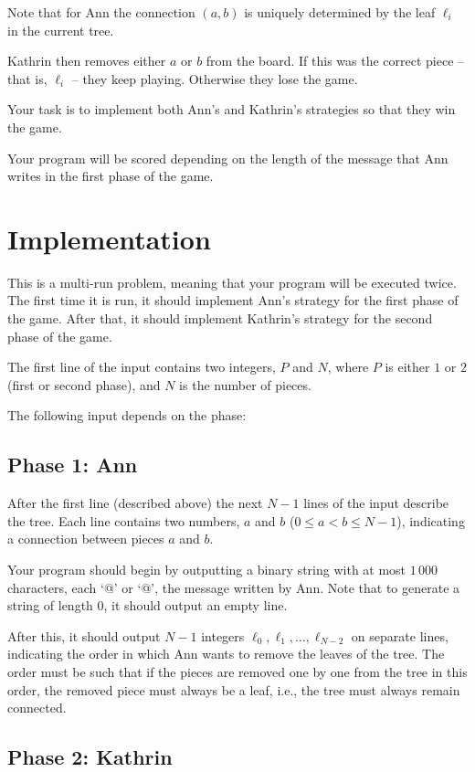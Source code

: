Note that for Ann the connection $(a,b)$ is uniquely determined by the leaf $\ell_i$ in the current tree. 

Kathrin then removes either $a$ or $b$ from the board.
If this was the correct piece -- that is, $\ell_i$ -- they keep playing.
Otherwise they lose the game. 

Your task is to implement both Ann's and Kathrin's strategies so that they win the game.

Your program will be scored depending on the length of the message that Ann writes in the first phase of the game.

\section*{Implementation}
This is a multi-run problem, meaning that your program will be executed twice.
The first time it is run, it should implement Ann's strategy for the first phase of the game. 
After that, it should implement Kathrin's strategy for the second phase of the game.

The first line of the input contains two integers, $P$ and $N$, where $P$ is either $1$ or $2$ (first or second phase),
and $N$ is the number of pieces.

The following input depends on the phase:

\subsection*{\textbf{Phase 1}: Ann}

After the first line (described above) the next $N - 1$ lines of the input describe the tree.
Each line contains two numbers, $a$ and $b$ ($0 \le a < b \le N-1$), indicating a connection between pieces $a$ and $b$.

Your program should begin by outputting a binary string with at most $1\,000$ characters, each `@' or `@', the message written by Ann.
Note that to generate a string of length $0$, it should output an empty line.

After this, it should output $N - 1$ integers $\ell_0, \ell_1, \ldots, \ell_{N-2}$ on separate lines, indicating the order in which Ann wants to remove the leaves of the tree.
The order must be such that if the pieces are removed one by one from the tree in this order, the removed piece must always be a leaf, i.e., the tree must always remain connected.

\subsection*{\textbf{Phase 2}: Kathrin}


